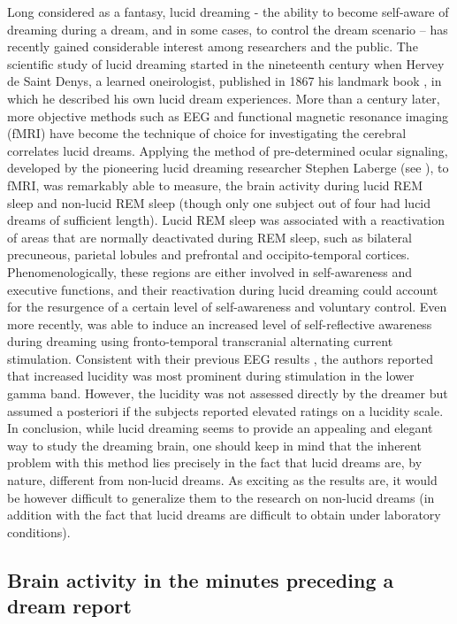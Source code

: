 Long considered as a fantasy, lucid dreaming - the ability to become self-aware of dreaming during a dream, and in some cases, to control the dream scenario – has recently gained considerable interest among researchers and the public. The scientific study of lucid dreaming started in the nineteenth century when Hervey de Saint Denys, a learned oneirologist, published in 1867 his landmark book , in which he described his own lucid dream experiences. More than a century later, more objective methods such as EEG and functional magnetic resonance imaging (fMRI) have become the technique of choice for investigating the cerebral correlates lucid dreams.
Applying the method of pre-determined ocular signaling, developed by the pioneering lucid dreaming researcher Stephen Laberge (see \citealp{laberge_exploring_1991}), to fMRI, \citet{dresler_neural_2012} was remarkably able to measure, the brain activity during lucid REM sleep and non-lucid REM sleep (though only one subject out of four had lucid dreams of sufficient length). Lucid REM sleep was associated with a reactivation of areas that are normally deactivated during REM sleep, such as bilateral precuneous, parietal lobules and prefrontal and occipito-temporal cortices. Phenomenologically, these regions are either involved in self-awareness and executive functions, and their reactivation during lucid dreaming could account for the resurgence of a certain level of self-awareness and voluntary control. Even more recently, \citet{voss_induction_2014} was able to induce an increased level of self-reflective awareness during dreaming using fronto-temporal transcranial alternating current stimulation. Consistent with their previous EEG results \citep{voss_lucid_2009}, the authors reported that increased lucidity was most prominent during stimulation in the lower gamma band. However, the lucidity was not assessed directly by the dreamer but assumed a posteriori if the subjects reported elevated ratings on a lucidity scale. In conclusion, while lucid dreaming seems to provide an appealing and elegant way to study the dreaming brain, one should keep in mind that the inherent problem with this method lies precisely in the fact that lucid dreams are, by nature, different from non-lucid dreams. As exciting as the results are, it would be however difficult to generalize them to the research on non-lucid dreams (in addition with the fact that lucid dreams are difficult to obtain under laboratory conditions).

\subsection{Brain activity in the minutes preceding a dream report}
\label{sec:dream-research:attempts:ba-pre}

